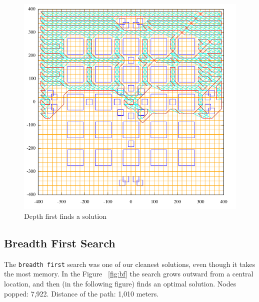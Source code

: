 \begin{figure}
\begin{center}\centering
\includegraphics[width=\textwidth]{df2.png}
\caption{Depth first finds a solution}
\end{center}
\end{figure}

\subsection{Breadth First Search}
The \texttt{breadth first} search was one of our cleanest solutions, even though it takes the most memory.  In the Figure ~\ref{fig:bf} the search grows outward from a central location, and then (in the following figure) finds an optimal solution.  Nodes popped: 7,922.  Distance of the path: 1,010 meters.

